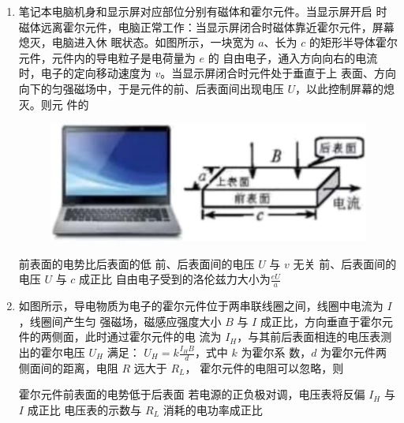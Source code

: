 


\begin{enumerate}
\item
{}
笔记本电脑机身和显示屏对应部位分别有磁体和霍尔元件。当显示屏开启
时磁体远离霍尔元件，电脑正常工作：当显示屏闭合时磁体靠近霍尔元件，屏幕熄灭，电脑进入休
眠状态。如图所示，一块宽为 $ a $、长为 $ c $ 的矩形半导体霍尔元件，元件内的导电粒子是电荷量为 $ e $ 的
自由电子，通入方向向右的电流时，电子的定向移动速度为 $ v $。当显示屏闭合时元件处于垂直于上
表面、方向向下的匀强磁场中，于是元件的前、后表面间出现电压 $ U $，以此控制屏幕的熄灭。则元
件的  
\begin{figure}[h!]
	\centering
	\includegraphics[width=0.4\linewidth]{picture/screenshot068}
\end{figure}


\fourchoices
{前表面的电势比后表面的低}
{前、后表面间的电压 $ U $ 与 $ v $ 无关}
{前、后表面间的电压 $ U $ 与 $ c $ 成正比}
{自由电子受到的洛伦兹力大小为$\frac{e U}{a}$}


\item 
{}
如图所示，导电物质为电子的霍尔元件位于两串联线圈之间，线圈中电流为 $ I $，线圈间产生匀
强磁场，磁感应强度大小 $ B $ 与 $ I $ 成正比，方向垂直于霍尔元件的两侧面，此时通过霍尔元件的电
流为 $ I_{H} $，与其前后表面相连的电压表测出的霍尔电压 $ U_{H} $ 满足： $U_{H}=k \frac{I_{H} B}{d}$，式中 $ k $ 为霍尔系
数，$ d $ 为霍尔元件两侧面间的距离，电阻 $ R $ 远大于 $ R_{L} $，
霍尔元件的电阻可以忽略，则  
\begin{figure}[h!]
	\centering
	
\end{figure}


\fourchoices
{霍尔元件前表面的电势低于后表面}
{若电源的正负极对调，电压表将反偏}
{$ I_{H} $ 与 $ I $ 成正比}
{电压表的示数与 $ R_{L} $ 消耗的电功率成正比}





\end{enumerate}
